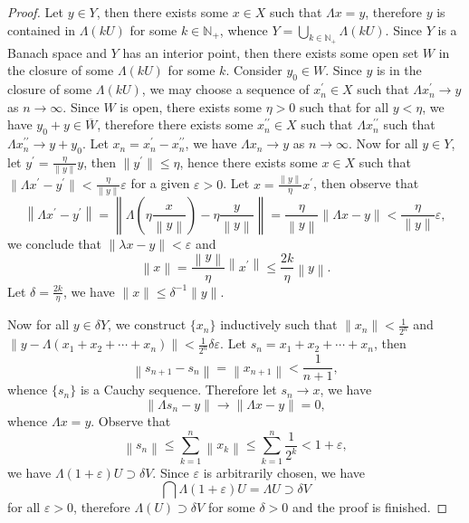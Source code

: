 \begin{proof}
Let $y\in Y$, then there exists some $x\in X$ such that $\Lambda x=y$, therefore $y$ is contained in $\Lambda(kU)$ for some $k\in\mathbb{N}_+$, whence $Y=\bigcup_{k\in\mathbb{N}_+}\Lambda(kU)$. Since $Y$ is a Banach space and $Y$ has an interior point, then there exists some open set $W$ in the closure of some $\Lambda(kU)$ for some $k$. Consider $y_0\in W$. Since $y$ is in the closure of some $\Lambda(kU)$, we may choose a sequence of $x_n^\prime\in X$ such that $\Lambda x_n^\prime\to y$ as $n\to\infty$. Since $W$ is open, there exists some $\eta>0$ such that for all $y<\eta$, we have $y_0+y\in\overline{W}$, therefore there exists some $x_n^{\prime\prime}\in X$ such that $\Lambda x_n^{\prime\prime}$ such that $\Lambda x_n^{\prime\prime}\to y+y_0$. Let $x_n=x_n^\prime-x_n^{\prime\prime}$, we have $\Lambda x_n\to y$ as $n\to\infty$. Now for all $y\in Y$, let $y^\prime=\frac{\eta}{\|y\|}y$, then $\|y^\prime\|\le\eta$, hence there exists some $x\in X$ such that $\|\Lambda x^\prime-y^\prime\|<\frac{\eta}{\|y\|}\varepsilon$ for a given $\varepsilon>0$. Let $x=\frac{\|y\|}{\eta}x^\prime$, then observe that 
$$
\left\| \Lambda x^{\prime}-y^{\prime} \right\| =\left\| \Lambda \left( \eta \frac{x}{\left\| y \right\|} \right) -\eta \frac{y}{\left\| y \right\|} \right\| =\frac{\eta}{\left\| y \right\|}\left\| \Lambda x-y \right\|<\frac{\eta}{\|y\|}\varepsilon ,
$$
we conclude that $\|\lambda x-y\|<\varepsilon$ and 
$$
\left\| x \right\| =\frac{\left\| y \right\|}{\eta}\left\| x^{\prime} \right\| \le \frac{2k}{\eta}\left\| y \right\| .
$$
Let $\delta=\frac{2k}{\eta}$, we have $\|x\|\le\delta^{-1}\|y\|$.\par
Now for all $y\in\delta Y$, we construct $\{x_n\}$ inductively such that $\|x_n\|<\frac{1}{2^n}$ and $\|y-\Lambda(x_1+x_2+\cdots+x_n)\|<\frac{1}{2^n}\delta\varepsilon$. Let $s_n=x_1+x_2+\cdots+x_n$, then 
$$
\left\| s_{n+1}-s_n \right\| =\left\| x_{n+1} \right\| <\frac{1}{n+1},
$$
whence $\{s_n\}$ is a Cauchy sequence. Therefore let $s_n\to x$, we have 
$$
\left\| \Lambda s_n-y \right\| \rightarrow \left\| \Lambda x-y \right\| =0,
$$
whence $\Lambda x=y$. Observe that 
$$
\left\| s_n \right\| \le \sum_{k=1}^n{\left\| x_k \right\|}\le \sum_{k=1}^n{\frac{1}{2^k}}<1+\varepsilon ,
$$
we have $\Lambda(1+\varepsilon)U\supset\delta V$. Since $\varepsilon$ is arbitrarily chosen, we have 
$$
\bigcap{\Lambda \left( 1+\varepsilon \right) U}=\Lambda U\supset \delta V
$$
for all $\varepsilon>0$, therefore $\Lambda(U)\supset\delta V$ for some $\delta>0$ and the proof is finished.
\end{proof}
